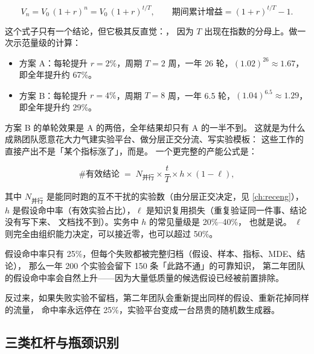 \begin{equation}
V_n = V_0\,(1+r)^{n} = V_0\,(1+r)^{t/T},
\qquad
\text{期间累计增益} = (1+r)^{t/T} - 1 .
\label{eq:growth-loop}
\end{equation}

这个式子只有一个结论，但它极其反直觉：，
因为 $T$ 出现在指数的分母上。做一次示范量级的计算：

\begin{itemize}
  \item 方案 A：每轮提升 $r = 2\%$，周期 $T = 2$ 周，一年 26 轮，$(1.02)^{26} \approx 1.67$，
        即全年提升约 67\%。
  \item 方案 B：每轮提升 $r = 4\%$，周期 $T = 8$ 周，一年 6.5 轮，$(1.04)^{6.5} \approx 1.29$，
        即全年提升约 29\%。
\end{itemize}

方案 B 的单轮效果是 A 的两倍，全年结果却只有 A 的一半不到。
这就是为什么成熟团队愿意花大力气建实验平台、做分层正交分流、写实验模板：
这些工作的直接产出不是「某个指标涨了」，而是。
一个更完整的产能公式是：

\begin{equation}
\#\text{有效结论} \;=\; N_{\text{并行}} \times \frac{t}{T} \times h \times (1-\ell),
\label{eq:growth-throughput}
\end{equation}

其中 $N_{\text{并行}}$ 是能同时跑的互不干扰的实验数（由分层正交决定，见 \cref{ch:receng}），
$h$ 是假设命中率（有效实验占比），$\ell$ 是知识复用损失（重复验证同一件事、结论没有写下来、
文档找不到）。实务中 $h$ 的常见量级是 20\%--40\%，
也就是说。
$\ell$ 则完全由组织能力决定，可以接近零，也可以超过 50\%。

\begin{insight}
假设命中率只有 25\%，但每个失败都被完整归档（假设、样本、指标、MDE、结论），
那么一年 200 个实验会留下 150 条「此路不通」的可靠知识，
第二年团队的假设命中率会自然上升——因为大量低质量的候选假设已经被前置排除。

反过来，如果失败实验不留档，第二年团队会重新提出同样的假设、重新花掉同样的流量，
命中率永远停在 25\%，实验平台变成一台昂贵的随机数生成器。
\end{insight}

\subsection{三类杠杆与瓶颈识别}

